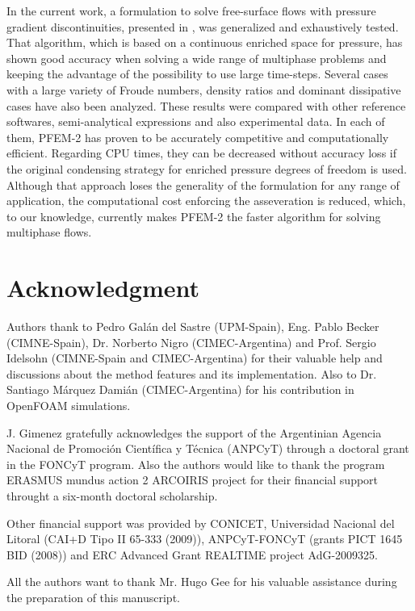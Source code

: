 \documentclass[review]{elsarticle}
\begin{document}
In the current work, a formulation to solve free-surface flows with pressure gradient discontinuities, presented in \cite{Idelsohn13c}, was generalized and exhaustively tested. That algorithm, which is based on a continuous enriched space for pressure, has shown good accuracy when solving a wide range of multiphase problems and keeping the advantage of the possibility to use large time-steps. Several cases with a large variety of Froude numbers, density ratios and dominant dissipative cases have also been analyzed. These results were compared with other reference softwares, semi-analytical expressions and also experimental data. In each of them, PFEM-2 has proven to be accurately competitive and computationally efficient. Regarding CPU times, they can be decreased without accuracy loss if the original condensing strategy for enriched pressure degrees of freedom is used. Although that approach loses the generality of the formulation for any range of application, the computational cost enforcing the asseveration is reduced, which, to our knowledge, currently makes PFEM-2 the faster algorithm for solving multiphase flows.

\section*{Acknowledgment}

Authors thank to Pedro Gal\'an del Sastre (UPM-Spain), Eng. Pablo Becker (CIMNE-Spain), Dr. Norberto Nigro (CIMEC-Argentina) and Prof. Sergio Idelsohn (CIMNE-Spain and CIMEC-Argentina) for their valuable help and discussions about the method features and its implementation. Also to Dr. Santiago M\'arquez Dami\'an (CIMEC-Argentina) for his contribution in OpenFOAM simulations.

J. Gimenez gratefully acknowledges the support of the Argentinian Agencia Nacional de Promoci\'on Cient\'ifica y T\' ecnica (ANPCyT) through a doctoral grant in the FONCyT program. Also the authors would like to thank the program ERASMUS mundus action 2 ARCOIRIS project for their financial support throught a six-month doctoral scholarship.

Other financial support was provided by CONICET, Universidad Nacional del Litoral (CAI+D Tipo II 65-333 (2009)), ANPCyT-FONCyT (grants PICT 1645 BID (2008)) and ERC Advanced Grant REALTIME project AdG-2009325.

All the authors want to thank Mr. Hugo Gee for his valuable assistance during the preparation of this manuscript.
\end{document}
